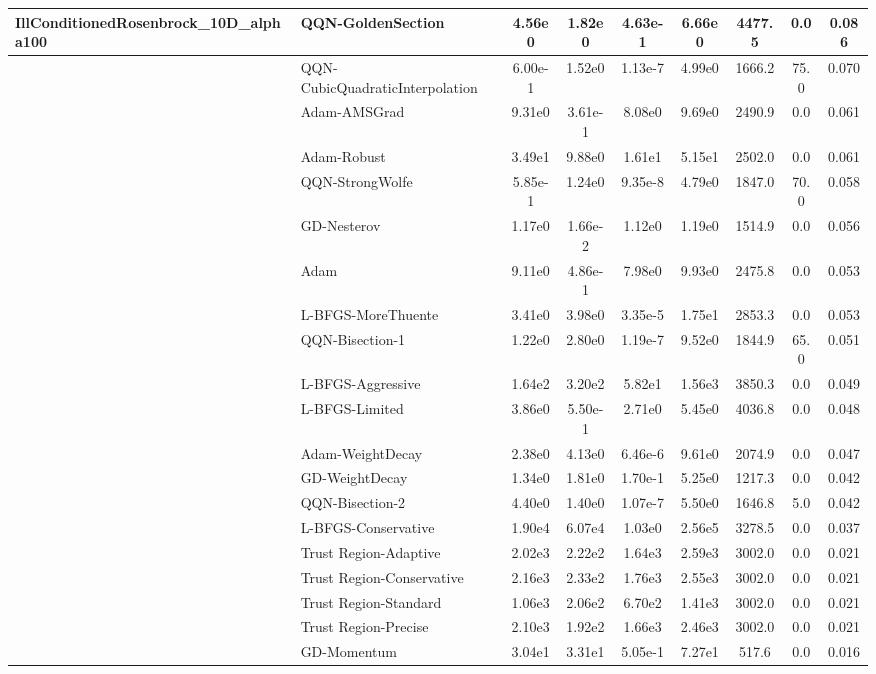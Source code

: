 \documentclass[10pt]{article}
\begin{document}
\begin{longtable}{|l|l|c|c|c|c|c|c|c|}
IllConditionedRosenbrock\_10D\_alpha100 & \textbf{QQN-GoldenSection} & 4.56e0 & 1.82e0 & 4.63e-1 & 6.66e0 & 4477.5 & 0.0 & 0.086 \\
\hline
 & QQN-CubicQuadraticInterpolation & 6.00e-1 & 1.52e0 & 1.13e-7 & 4.99e0 & 1666.2 & 75.0 & 0.070 \\
\hline
 & Adam-AMSGrad & 9.31e0 & 3.61e-1 & 8.08e0 & 9.69e0 & 2490.9 & 0.0 & 0.061 \\
\hline
 & Adam-Robust & 3.49e1 & 9.88e0 & 1.61e1 & 5.15e1 & 2502.0 & 0.0 & 0.061 \\
\hline
 & QQN-StrongWolfe & 5.85e-1 & 1.24e0 & 9.35e-8 & 4.79e0 & 1847.0 & 70.0 & 0.058 \\
\hline
 & GD-Nesterov & 1.17e0 & 1.66e-2 & 1.12e0 & 1.19e0 & 1514.9 & 0.0 & 0.056 \\
\hline
 & Adam & 9.11e0 & 4.86e-1 & 7.98e0 & 9.93e0 & 2475.8 & 0.0 & 0.053 \\
\hline
 & L-BFGS-MoreThuente & 3.41e0 & 3.98e0 & 3.35e-5 & 1.75e1 & 2853.3 & 0.0 & 0.053 \\
\hline
 & QQN-Bisection-1 & 1.22e0 & 2.80e0 & 1.19e-7 & 9.52e0 & 1844.9 & 65.0 & 0.051 \\
\hline
 & L-BFGS-Aggressive & 1.64e2 & 3.20e2 & 5.82e1 & 1.56e3 & 3850.3 & 0.0 & 0.049 \\
\hline
 & L-BFGS-Limited & 3.86e0 & 5.50e-1 & 2.71e0 & 5.45e0 & 4036.8 & 0.0 & 0.048 \\
\hline
 & Adam-WeightDecay & 2.38e0 & 4.13e0 & 6.46e-6 & 9.61e0 & 2074.9 & 0.0 & 0.047 \\
\hline
 & GD-WeightDecay & 1.34e0 & 1.81e0 & 1.70e-1 & 5.25e0 & 1217.3 & 0.0 & 0.042 \\
\hline
 & QQN-Bisection-2 & 4.40e0 & 1.40e0 & 1.07e-7 & 5.50e0 & 1646.8 & 5.0 & 0.042 \\
\hline
 & L-BFGS-Conservative & 1.90e4 & 6.07e4 & 1.03e0 & 2.56e5 & 3278.5 & 0.0 & 0.037 \\
\hline
 & Trust Region-Adaptive & 2.02e3 & 2.22e2 & 1.64e3 & 2.59e3 & 3002.0 & 0.0 & 0.021 \\
\hline
 & Trust Region-Conservative & 2.16e3 & 2.33e2 & 1.76e3 & 2.55e3 & 3002.0 & 0.0 & 0.021 \\
\hline
 & Trust Region-Standard & 1.06e3 & 2.06e2 & 6.70e2 & 1.41e3 & 3002.0 & 0.0 & 0.021 \\
\hline
 & Trust Region-Precise & 2.10e3 & 1.92e2 & 1.66e3 & 2.46e3 & 3002.0 & 0.0 & 0.021 \\
\hline
 & GD-Momentum & 3.04e1 & 3.31e1 & 5.05e-1 & 7.27e1 & 517.6 & 0.0 & 0.016 \\

\end{longtable}
\end{document}
